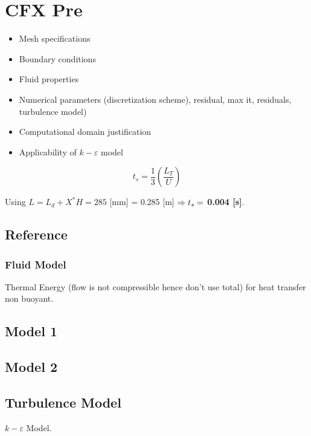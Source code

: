 \chapter{CFX Pre}
\label{ch:pre}

\begin{itemize}
	\item Mesh specifications
	\item Boundary conditions
	\item Fluid properties
	\item Numerical parameters (discretization scheme), residual, max it, residuals, turbulence model)
	\item Computational domain justification 
	\item Applicability of $k-\varepsilon$ model
\end{itemize}

\begin{equation}
	\label{eq:ts}
	t_s = \frac{1}{3} \left( \frac{L_T}{U} \right)
\end{equation}

Using $L = L_d + X^* H = 285$ [mm] = 0.285 [m] $\Rightarrow \boldmath{t_s =}$ \textbf{0.004 [s]}.  

\section{Reference}
\label{sec:pre_ref}

\subsection{Fluid Model}
Thermal Energy (flow is not compressible hence don't use total) for heat transfer non buoyant.

\section{Model 1}
\label{sec:pre_mod1}


\section{Model 2}
\label{sec:pre_mod2}

\section{Turbulence Model}
\label{sec:pre_turb}

$k-\varepsilon$ Model.
